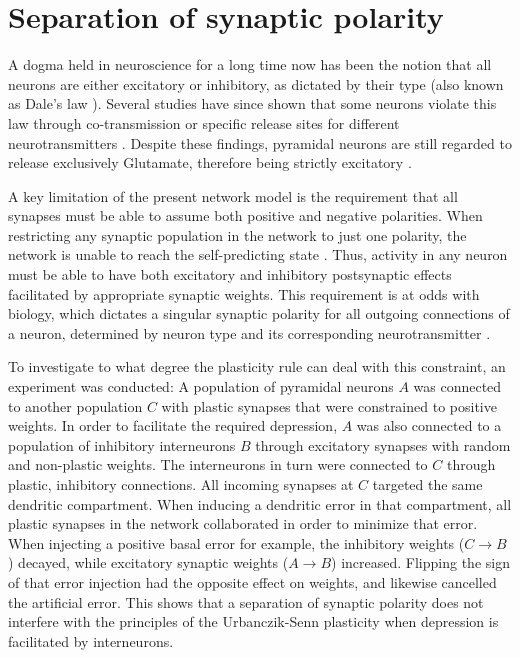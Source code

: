 \section{Separation of synaptic polarity}


A dogma held in neuroscience for a long time now has been the notion that all neurons are either excitatory or
inhibitory, as dictated by their type (also known as Dale's law \citep{Kandel1968}). Several studies have since shown
that some neurons violate this law through co-transmission or specific release sites for different neurotransmitters
\citep{Svensson2019,Barranca2022}. Despite these findings, pyramidal neurons are still regarded to release exclusively
Glutamate, therefore being strictly excitatory \citep{gerfen2018long,spruston2008pyramidal,Eyal2018}.



A key limitation of the present network model is the requirement that all synapses must be able to assume both positive
and negative polarities. When restricting any synaptic population in the network to just one polarity, the network is
unable to reach the self-predicting state . Thus, activity in any neuron must be able to have both
excitatory and inhibitory postsynaptic effects facilitated by appropriate synaptic weights. This requirement is at odds
with biology, which dictates a singular synaptic polarity for all outgoing connections of a neuron, determined by neuron
type and its corresponding neurotransmitter \citeme.


To investigate to what degree the plasticity rule can deal with this constraint, an experiment was conducted: A
population of pyramidal neurons $A$  was connected to another population $C$ with plastic synapses that were constrained
to positive weights. In order to facilitate the required depression, $A$ was also connected to a population of
inhibitory interneurons $B$ through excitatory synapses with random and non-plastic weights. The interneurons in turn
were connected to $C$ through plastic, inhibitory connections. All incoming synapses at $C$ targeted the same dendritic
compartment. When inducing a dendritic error in that compartment, all plastic synapses in the network collaborated in
order to minimize that error. When injecting a positive basal error for example, the inhibitory weights ($C \rightarrow
    B$) decayed, while excitatory synaptic weights ($A \rightarrow B$) increased. Flipping the sign of that error injection
had the opposite effect on weights, and likewise cancelled the artificial error. This shows that a separation of
synaptic polarity does not interfere with the principles of the Urbanczik-Senn plasticity when depression is facilitated
by interneurons.

